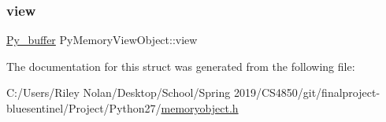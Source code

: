 \subsubsection{\texorpdfstring{view}{view}}
{\footnotesize\ttfamily \mbox{\hyperlink{_python27_2object_8h_a0c1c5dc66cfb07c46b863b5186f61cf4}{Py\+\_\+buffer}} Py\+Memory\+View\+Object\+::view}



The documentation for this struct was generated from the following file\+:\begin{DoxyCompactItemize}
\item 
C\+:/\+Users/\+Riley Nolan/\+Desktop/\+School/\+Spring 2019/\+C\+S4850/git/finalproject-\/bluesentinel/\+Project/\+Python27/\mbox{\hyperlink{memoryobject_8h}{memoryobject.\+h}}\end{DoxyCompactItemize}
